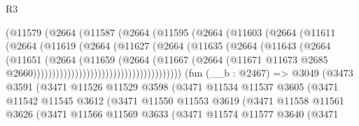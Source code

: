 \begin{lexlean}{R3}
\begin{coremodule}
                                (@11579
                                  (@2664
                                    (@11587
                                      (@2664
                                        (@11595
                                          (@2664
                                            (@11603
                                              (@2664
                                                (@11611
                                                  (@2664
                                                    (@11619
                                                      (@2664
                                                        (@11627
                                                          (@2664
                                                            (@11635
                                                              (@2664
                                                                (@11643
                                                                  (@2664
                                                                    (@11651
                                                                      (@2664
                                                                        (@11659
                                                                          (@2664
                                                                            (@11667
                                                                              (@2664
                                                                                (@11671
                                                                                  @11673
                                                                                  @2685
                                                                                  @2660)))))))))))))))))))))))))))))))))))))))
    (fun (__b : @2467) =>
    @3049
      (@3473
        @3591
        (@3471
          @11526
          @11529
          @3598
          (@3471
            @11534
            @11537
            @3605
            (@3471
              @11542
              @11545
              @3612
              (@3471
                @11550
                @11553
                @3619
                (@3471
                  @11558
                  @11561
                  @3626
                  (@3471
                    @11566
                    @11569
                    @3633
                    (@3471
                      @11574
                      @11577
                      @3640
                      (@3471

\end{coremodule}
\end{lexlean}

